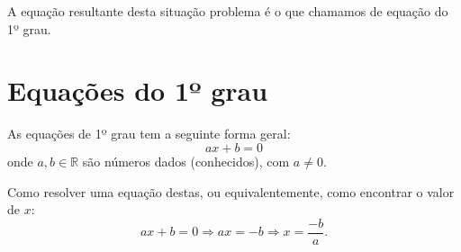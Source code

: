 




A equação resultante desta situação problema é o que chamamos de equação do 1º grau.

\section{Equações do 1º grau}

\begin{obs}
   As equações de 1º grau tem a seguinte forma geral:
\begin{equation*}
ax + b = 0
\end{equation*}
onde $a, b \in \mathbb{R}$ são números dados (conhecidos), com $a \neq 0 $.
\end{obs}

Como resolver uma equação destas, ou equivalentemente, como encontrar o valor de $x$:
\begin{equation*}
ax + b = 0 \Rightarrow ax= -b \Rightarrow x = \frac{-b}{a} .
\end{equation*}


